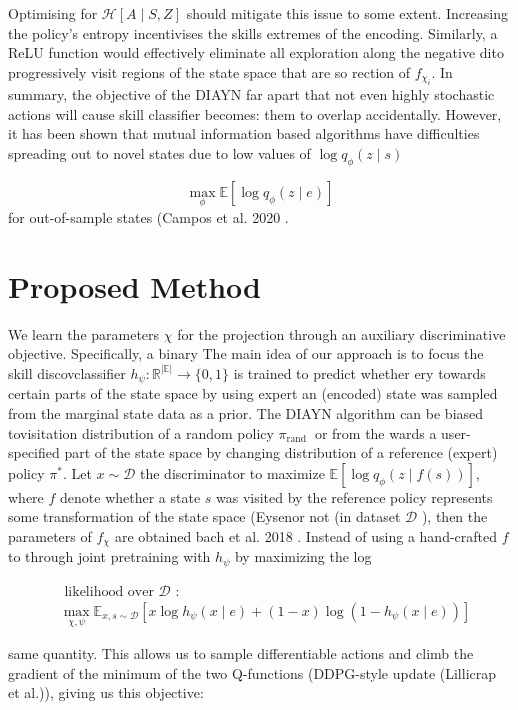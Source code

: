 Optimising for $\mathcal{H}[A \mid S, Z]$ should mitigate this issue to some extent. Increasing the policy's entropy incentivises the skills extremes of the encoding. Similarly, a ReLU function would effectively eliminate all exploration along the negative dito progressively visit regions of the state space that are so rection of $f_{\chi_{i}}$. In summary, the objective of the DIAYN far apart that not even highly stochastic actions will cause skill classifier becomes: them to overlap accidentally. However, it has been shown that mutual information based algorithms have difficulties spreading out to novel states due to low values of $\log q_{\phi}(z \mid s)$

$$
\max _{\phi} \mathbb{E}\left[\log q_{\phi}(z \mid e)\right]
$$
for out-of-sample states (Campos et al. 2020 .

\section{Proposed Method}

We learn the parameters $\chi$ for the projection through an auxiliary discriminative objective. Specifically, a binary The main idea of our approach is to focus the skill discovclassifier $h_{\psi}: \mathbb{R}^{|\mathbb{E}|} \rightarrow\{0,1\}$ is trained to predict whether ery towards certain parts of the state space by using expert an (encoded) state was sampled from the marginal state data as a prior. The DIAYN algorithm can be biased tovisitation distribution of a random policy $\pi_{\text {rand }}$ or from the wards a user-specified part of the state space by changing distribution of a reference (expert) policy $\pi^{*}$. Let $x \sim \mathcal{D}$ the discriminator to maximize $\mathbb{E}\left[\log q_{\phi}(z \mid f(s))\right]$, where $f$ denote whether a state $s$ was visited by the reference policy represents some transformation of the state space (Eysenor not (in dataset $\mathcal{D}$ ), then the parameters of $f_{\chi}$ are obtained bach et al. 2018 . Instead of using a hand-crafted $f$ to through joint pretraining with $h_{\psi}$ by maximizing the log 

$$
\begin{aligned}
&\text { likelihood over } \mathcal{D} \text { : } \\
&\max _{\chi, \psi} \mathbb{E}_{x, s \sim \mathcal{D}}\left[x \log h_{\psi}(x \mid e)+(1-x) \log \left(1-h_{\psi}(x \mid e)\right)\right]
\end{aligned}
$$

same quantity. This allows us to sample differentiable actions and climb the gradient of the minimum of the two Q-functions (DDPG-style update (Lillicrap et al.)), giving us this objective:

